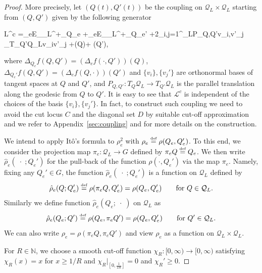 \documentclass[11pt,UTF-8,reqno]{amsart}
\numberwithin{equation}{section}
\def\<{{\langle}}
\def\>{{\rangle}}
\newcommand{\eqdef}{\stackrel{\mbox{\tiny def}}{=}}
\def\cL{{\mathcal L}}
\def\cQ{{\mathcal Q}}
\def\cS{{\mathcal S}}
\def\mN{{\mathbb N}}
\def\geq{\geqslant}
\def\q{\mathfrak{q}}
\def\<{{\langle}}
\def\>{{\rangle}}
\def\geq{\geqslant}
\def\<{\langle} \def\>{\rangle}
\begin{document}
\begin{proof}
 More precisely,
	let $(Q(t),Q'(t))$ be the coupling on $\cQ_L\times \cQ_L$ starting from $(Q,Q')$ given by  the  following generator
	\begin{equ}[e:Lc]
		\cL^c
		=\sum_{e\in E_{\Lambda_{L}}^+}\Delta_{Q_e}
		+\sum_{e\in E_{\Lambda_{L}}^+}\Delta_{Q_e'}
		+2\sum_{i,j=1}^{\dim \q_L}\Big\<P_{Q,Q'}v_i,v'_j \Big\>_{T_{Q'}\cQ_L}v_iv'_j
		+\nabla\cS(Q)+ \nabla\cS(Q'),
	\end{equ}
where $\Delta_{Q_e}f(Q,Q')=(\Delta_e f(\cdot,Q'))(Q)$, $\Delta_{Q_e'}f(Q,Q')=(\Delta_e f(Q,\cdot))(Q')$ and  
$\{v_i\}, \{v_j'\}$ are orthonormal bases of tangent spaces at $Q$ and $Q'$,
 and $P_{Q,Q'}:T_Q\cQ_L\to T_{Q'}\cQ_L$ is the parallel translation along the geodesic from $Q$ to $Q'$.
 It is easy to see that $\cL^c$ is independent of the choices of the basis $\{v_i\}, \{v_j'\}$. In fact, to construct such coupling we need to avoid the cut locus $C$ and the diagonal set $D$ by suitable cut-off approximation and we refer to Appendix~\ref{sec:coupling} and \cite[Section 2.1]{Wang} for more details on the construction.
	
	
We intend to apply It\^o's formula to $\rho_e^2$ with $\rho_e\eqdef \rho(Q_e,Q_e')$.
To this end, we consider the projection map $\pi_e: \cQ_L \to G$ defined by $\pi_e Q\eqdef Q_e$.
We then
write $\hat\rho_e( \;\cdot \;  ; Q_e')$ for the pull-back of the function
$\rho(\cdot,Q_e')$ via the map $\pi_e$.
Namely, fixing any $ Q_e' \in G$, the function
$\hat\rho_e( \;\cdot \;  ; Q_e')$ is a function on $\cQ_L$ defined by
$$
	\hat\rho_e(Q ; Q_e')
	\eqdef \rho(\pi_e Q , Q_e') = \rho(Q_e , Q_e')
	\qquad
	\mbox{for } Q\in \cQ_L.
$$
Similarly we  define  function $\hat\rho_e(  Q_e ; \;\cdot \;  )$ on $\cQ_L$ as
$$
	\hat\rho_e(Q_e ; Q')
	\eqdef \rho(Q_e , \pi_e Q') = \rho(Q_e , Q_e')
	\qquad
	\mbox{for } Q'\in \cQ_L.
$$	
We can also write $\rho_e=\rho(\pi_eQ,\pi_eQ')$ and view $\rho_e$ as a function on $\cQ_L\times \cQ_L$.
	
For $R\in \mN$, we choose a smooth cut-off function $\chi_R:[0,\infty)\to [0,\infty)$ satisfying $\chi_R(x)=x$ for $x\geq 1/R$ and $\chi_R|_{[0,\frac1{2R}]}=0$ and $\chi_R'\geq0$. 


\end{proof}
\end{document}
